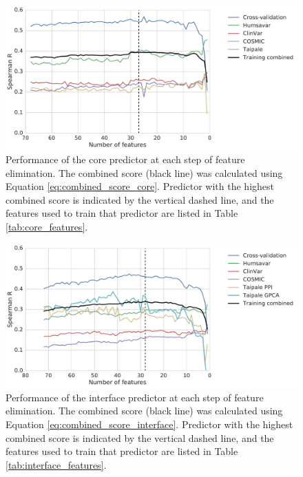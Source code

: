 
\begin{figure}[tb]
	\includegraphics[width=0.9\linewidth]{static/elaspic_training_set/machine_learning/feature_elimination_core.pdf}
	\caption[Core predictor feature elimination.]{
		Performance of the core predictor at each step of feature elimination.
		The combined score (black line) was calculated using Equation \ref{eq:combined_score_core}.
		Predictor with the highest combined score is indicated by the vertical dashed line,
		and the features used to train that predictor are listed in Table \ref{tab:core_features}.
	}
	\label{fig:feature_elimination_core}
\end{figure}

\begin{figure}[tb]
	\includegraphics[width=0.9\linewidth]{static/elaspic_training_set/machine_learning/feature_elimination_interface.pdf}
	\caption[Interface predictor feature elimination.]{
		Performance of the interface predictor at each step of feature elimination.
		The combined score (black line) was calculated using Equation \ref{eq:combined_score_interface}.
		Predictor with the highest combined score is indicated by the vertical dashed line,
		and the features used to train that predictor are listed in Table \ref{tab:interface_features}.
	}
	\label{fig:feature_elimination_interface}
\end{figure}

